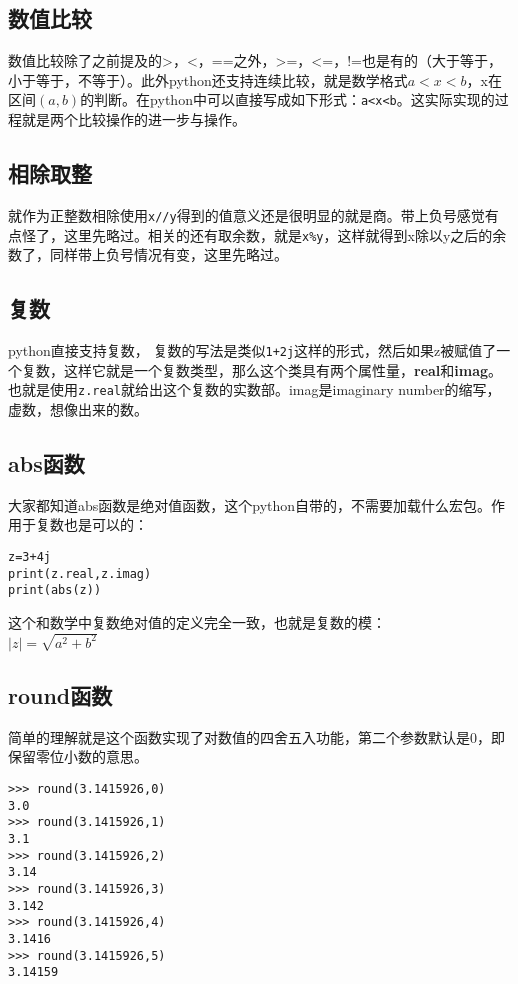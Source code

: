 \documentclass[12pt,oneside]{book}
\begin{document}
\begin{common-format}
\subsection{数值比较}
数值比较除了之前提及的>，<，==之外，>=，<=，!=也是有的（大于等于，小于等于，不等于）。此外python还支持连续比较，就是数学格式$a<x<b$，x在区间$(a,b)$的判断。在python中可以直接写成如下形式：\verb+a<x<b+。这实际实现的过程就是两个比较操作的进一步与操作。

\subsection{相除取整}
就作为正整数相除使用\verb+x//y+得到的值意义还是很明显的就是商。带上负号感觉有点怪了，这里先略过。相关的还有取余数，就是\verb+x%y+，这样就得到x除以y之后的余数了，同样带上负号情况有变，这里先略过。



\subsection{复数}
python直接支持复数， 复数的写法是类似\verb|1+2j|这样的形式，然后如果z被赋值了一个复数，这样它就是一个复数类型，那么这个类具有两个属性量，\textbf{real}和\textbf{imag}。也就是使用\verb+z.real+就给出这个复数的实数部。imag是imaginary number的缩写，虚数，想像出来的数。

\subsection{abs函数}
大家都知道abs函数是绝对值函数，这个python自带的，不需要加载什么宏包。作用于复数也是可以的：
\begin{Verbatim}
z=3+4j
print(z.real,z.imag)
print(abs(z))
\end{Verbatim}

这个和数学中复数绝对值的定义完全一致，也就是复数的模：\\
$ \left| z \right| =\sqrt { a^{ 2 }+b^{ 2 } }  $

\subsection{round函数}
简单的理解就是这个函数实现了对数值的四舍五入功能，第二个参数默认是0，即保留零位小数的意思。
\begin{Verbatim}
>>> round(3.1415926,0)
3.0
>>> round(3.1415926,1)
3.1
>>> round(3.1415926,2)
3.14
>>> round(3.1415926,3)
3.142
>>> round(3.1415926,4)
3.1416
>>> round(3.1415926,5)
3.14159
\end{Verbatim}




\end{common-format}
\end{document}
